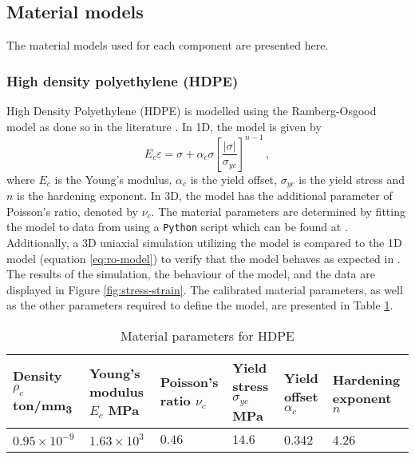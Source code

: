 \documentclass{article}
\begin{document}
\subsection{Material models}
The material models used for each component are presented here.
\subsubsection{High density polyethylene (HDPE)}
High Density Polyethylene (HDPE) is modelled using the Ramberg-Osgood model as done so in the literature \cite{amjadi2020tensile}. In 1D, the model is given by
\begin{equation}
	E_{c}\varepsilon = \sigma + \alpha_{c} \sigma\left[\dfrac{|\sigma|}{\sigma_{yc}}\right]^{n-1}\,,
	\label{eq:ro-model}
\end{equation} 
where $E_{c}$ is the Young's modulus, $\alpha_{c}$ is the yield offset, $\sigma_{yc}$ is the yield stress and $n$ is the hardening exponent. In 3D, the model has the additional parameter of Poisson's ratio, denoted by $\nu_{c}$. The material parameters are determined by fitting the model to data from \cite{amjadi2020tensile} using a \texttt{Python} script which can be found at . Additionally, a 3D uniaxial \abaqus simulation utilizing the model is compared to the 1D model (equation \eqref{eq:ro-model}) to verify that the model behaves as expected in \abaqus. The results of the simulation, the behaviour of the model, and the data are displayed in Figure \ref{fig:stress-strain}.
The calibrated material parameters, as well as the other parameters required to define the model, are presented in Table \ref{tab:hdpe-mat-params}.
\begin{table}[!htb]
	\newcommand{\colsize}{2.cm}
	\centering
	\caption{Material parameters for HDPE}
	\label{tab:hdpe-mat-params}
	\begin{tabular}{p{\colsize}| p{\colsize} | p{\colsize} | p{\colsize} | p{\colsize} | p{\colsize}}
		Density $\rho_{c}$ ton/mm\textsubscript{3} \cite{dasari2003microstructural, amjadi2020tensile} & Young's modulus $E_{c}$ MPa & Poisson's ratio $\nu_{c}$ \cite{nitta2012poisson} &  Yield stress $\sigma_{yc}$ MPa & Yield offset $\alpha_{c}$ & Hardening exponent $n$\\
		\hline\hline
		$0.95\times 10^{-9}$ & $1.63\times 10^{3}$ & $0.46$ & $14.6$ & 0.342 & 4.26
	\end{tabular}
\end{table}
\end{document}
